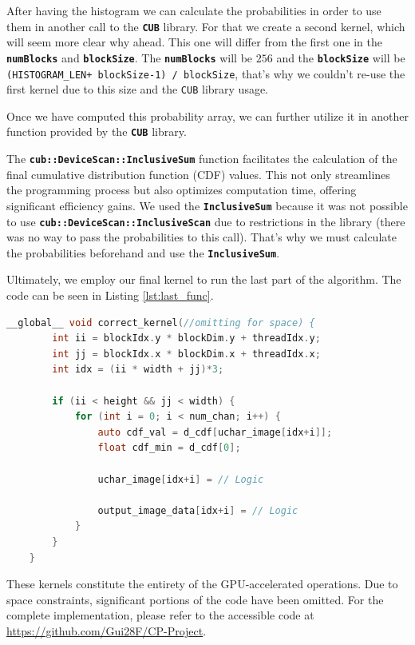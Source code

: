 \documentclass[sigconf]{acmart}
\begin{document}
After having the histogram we can calculate the probabilities in order to use them in another call to the \texttt{\textbf{CUB}} library. For that we create a second kernel, which will seem more clear why ahead. This one will differ from the first one in the \texttt{\textbf{numBlocks}} and \texttt{\textbf{blockSize}}. The \texttt{\textbf{numBlocks}} will be $256$ and the \texttt{\textbf{blockSize}} will be \texttt{(HISTOGRAM\_LEN+ blockSize-1) / blockSize}, that's why we couldn't re-use the first kernel due to this size and the \texttt{CUB} library usage.

Once we have computed this probability array, we can further utilize it in another function provided by the \texttt{\textbf{CUB}}  library.

The \texttt{\textbf{cub::DeviceScan::InclusiveSum}} function facilitates the calculation of the final cumulative distribution function (CDF) values. This not only streamlines the programming process but also optimizes computation time, offering significant efficiency gains. We used the \texttt{\textbf{InclusiveSum}} because it was not possible to use \texttt{\textbf{cub::DeviceScan::InclusiveScan}} due to restrictions in the library (there was no way to pass the probabilities to this call). That's why we must calculate the probabilities beforehand and use the \texttt{\textbf{InclusiveSum}}.

Ultimately, we employ our final kernel to run the last part of the algorithm. The code can be seen in Listing \ref{lst:last_func}.

\begin{lstlisting}[language=C, caption=Correct and Rescale, label={lst:last_func}]
 __global__ void correct_kernel(//omitting for space) {
        int ii = blockIdx.y * blockDim.y + threadIdx.y;
        int jj = blockIdx.x * blockDim.x + threadIdx.x;
        int idx = (ii * width + jj)*3;

        if (ii < height && jj < width) {
            for (int i = 0; i < num_chan; i++) {
                auto cdf_val = d_cdf[uchar_image[idx+i]];
                float cdf_min = d_cdf[0];
                
                uchar_image[idx+i] = // Logic

                output_image_data[idx+i] = // Logic
            }
        }
    }
\end{lstlisting}
These kernels constitute the entirety of the GPU-accelerated operations. Due to space constraints, significant portions of the code have been omitted. For the complete implementation, please refer to the accessible code at \url{https://github.com/Gui28F/CP-Project}. 
\end{document}
